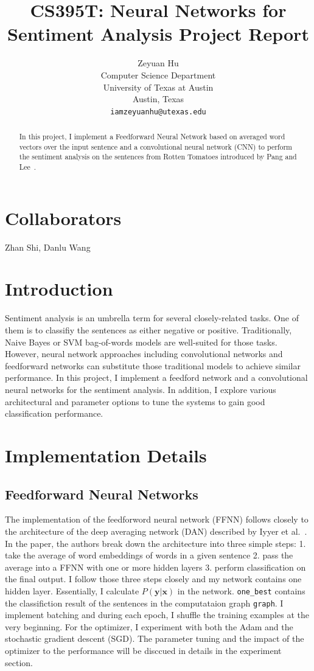 \documentclass[11pt,a4paper]{article}
\title{CS395T: Neural Networks for Sentiment Analysis Project Report}
\author{Zeyuan Hu \\
  Computer Science Department \\
  University of Texas at Austin \\
  Austin, Texas \\
  {\tt iamzeyuanhu@utexas.edu} \\
}
\date{}
\begin{document}
\maketitle

\begin{abstract}
In this project, I implement a Feedforward Neural Network based on
averaged word vectors over the input sentence and a convolutional neural
network (CNN) to perform the sentiment analysis on the sentences from
Rotten Tomatoes introduced by Pang and Lee~.
\end{abstract}

\section{Collaborators}
Zhan Shi, Danlu Wang

\section{Introduction}

Sentiment analysis is an umbrella term for several closely-related tasks. One of them is to
classifiy the sentences as either negative or positive. Traditionally, Naive Bayes or SVM
bag-of-words models are well-suited for those tasks. However, neural network approaches
including convolutional networks \cite{Kim14f} and feedforward networks \cite{Iyyer2015} 
can substitute those traditional models to achieve similar performance. In this project,
I implement a feedford network and a convolutional neural networks for the sentiment analysis.
In addition, I explore various architectural and parameter options to 
tune the systems to gain good classification performance.

\section{Implementation Details}

\subsection{Feedforward Neural Networks}

The implementation of the feedforword neural network (FFNN) follows closely to
the architecture of the deep averaging network (DAN)
described by Iyyer et al.~. In the paper, the authors
break down the architecture into three simple steps: 1. take the average of
word embeddings of words in a given sentence 2. pass the average into a 
FFNN with one or more hidden layers 3. perform classification
on the final output. I follow those three steps closely and my network contains
one hidden layer. Essentially, I calculate $P(\boldsymbol{y}|\boldsymbol{x})$ in the network.
\verb|one_best| contains the classifiction result of the sentences in the computataion graph \verb|graph|.
I implement batching and during each epoch, I shuffle
the training examples at the very beginning. For the optimizer, I experiment with both the Adam
and the stochastic gradient descent (SGD). The parameter tuning and the impact of the optimizer
to the performance will be disccued in details in the experiment section.
\end{document}
